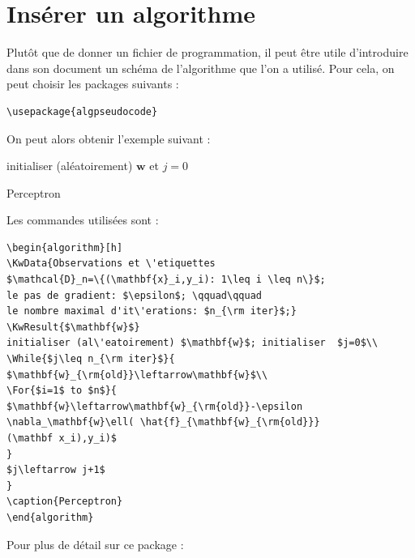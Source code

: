\section{Insérer un algorithme}
Plutôt que de donner un fichier de programmation, il peut être utile d'introduire dans son document
 un schéma de l'algorithme que l'on a utilisé. Pour cela, on peut choisir les packages suivants :\medskip

\begin{lstlisting}
\usepackage{algpseudocode}
\end{lstlisting}

On peut alors obtenir  l'exemple suivant :\medskip 


\begin{algorithm}[h]
initialiser (aléatoirement) $\mathbf{w}$ et  $j=0$\\
\caption{Perceptron}
\end{algorithm}

Les commandes utilisées sont : 

\begin{lstlisting}
\begin{algorithm}[h]
\KwData{Observations et \'etiquettes 
$\mathcal{D}_n=\{(\mathbf{x}_i,y_i): 1\leq i \leq n\}$;
le pas de gradient: $\epsilon$; \qquad\qquad 
le nombre maximal d'it\'erations: $n_{\rm iter}$;}
\KwResult{$\mathbf{w}$}
initialiser (al\'eatoirement) $\mathbf{w}$; initialiser  $j=0$\\
\While{$j\leq n_{\rm iter}$}{
$\mathbf{w}_{\rm{old}}\leftarrow\mathbf{w}$\\
\For{$i=1$ to $n$}{
$\mathbf{w}\leftarrow\mathbf{w}_{\rm{old}}-\epsilon 
\nabla_\mathbf{w}\ell( \hat{f}_{\mathbf{w}_{\rm{old}}}
(\mathbf x_i),y_i)$
}
$j\leftarrow j+1$
}
\caption{Perceptron}
\end{algorithm}
\end{lstlisting}


\noindent Pour plus de détail sur ce package :

